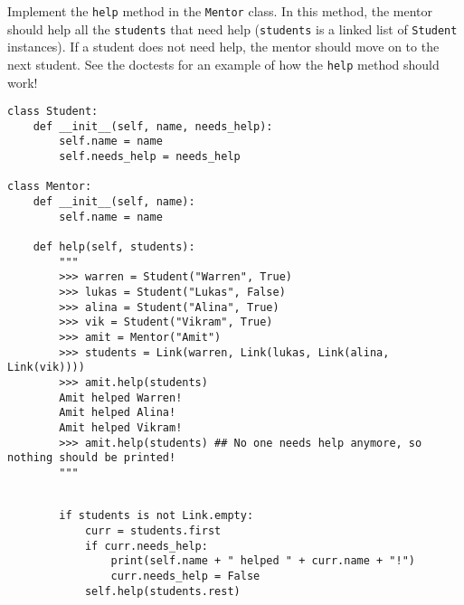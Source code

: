 \begin{blocksection}
\question Implement the \texttt{help} method in the \texttt{Mentor} class. In this method, the mentor should help all the \lstinline{students} that need help (\lstinline{students} is a linked list of \lstinline{Student} instances). If a student does not need help, the mentor should move on to the next student. See the doctests for an example of how the \texttt{help} method should work!

\begin{lstlisting}
class Student:
    def __init__(self, name, needs_help):
        self.name = name
        self.needs_help = needs_help

class Mentor:
    def __init__(self, name):
        self.name = name

    def help(self, students):
        """
        >>> warren = Student("Warren", True)
        >>> lukas = Student("Lukas", False)
        >>> alina = Student("Alina", True)
        >>> vik = Student("Vikram", True)
        >>> amit = Mentor("Amit")
        >>> students = Link(warren, Link(lukas, Link(alina, Link(vik))))
        >>> amit.help(students)
        Amit helped Warren!
        Amit helped Alina!
        Amit helped Vikram!
        >>> amit.help(students) ## No one needs help anymore, so nothing should be printed!
        """


\end{lstlisting}

\begin{solution}
\begin{lstlisting}
        if students is not Link.empty:
            curr = students.first
            if curr.needs_help:
                print(self.name + " helped " + curr.name + "!")
                curr.needs_help = False
            self.help(students.rest)
\end{lstlisting}
\end{solution}
\end{blocksection}